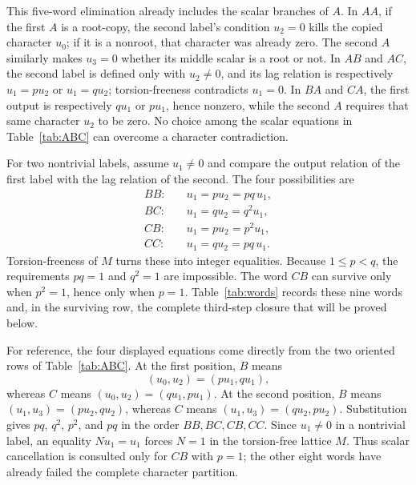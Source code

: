 \documentclass[11pt]{article}
\theoremstyle{definition}
\theoremstyle{remark}
\begin{document}
This five-word elimination already includes the scalar branches of $A$.
In $AA$, if the first $A$ is a root-copy, the second label's condition
$u_2=0$ kills the copied character $u_0$; if it is a nonroot, that character
was already zero.  The second $A$ similarly makes $u_3=0$ whether its middle
scalar is a root or not.  In $AB$ and $AC$, the second label is defined only
with $u_2\neq0$, and its lag relation is respectively
$u_1=p u_2$ or $u_1=q u_2$; torsion-freeness contradicts $u_1=0$.  In
$BA$ and $CA$, the first output is respectively $q u_1$ or $p u_1$, hence
nonzero, while the second $A$ requires that same character $u_2$ to be
zero.  No choice among the scalar equations in Table~\ref{tab:ABC} can
overcome a character contradiction.

For two nontrivial labels, assume $u_1\neq0$ and compare the output relation of the first label with the lag relation of the second.  The four possibilities are
\begin{align}
BB:&\quad u_1=p u_2=pq\,u_1, 
\label{eq:BB}\\
BC:&\quad u_1=q u_2=q^2u_1,
\label{eq:BC}\\
CB:&\quad u_1=p u_2=p^2u_1,
\label{eq:CB}\\
CC:&\quad u_1=q u_2=pq\,u_1.
\label{eq:CC}
\end{align}
Torsion-freeness of $M$ turns these into integer equalities.  Because $1\leq p<q$, the requirements $pq=1$ and $q^2=1$ are impossible.  The word $CB$ can survive only when $p^2=1$, hence only when $p=1$.  Table~\ref{tab:words} records these nine words and, in the surviving row, the complete third-step closure that will be proved below.

For reference, the four displayed equations come directly from the two
oriented rows of Table~\ref{tab:ABC}.  At the first position, $B$ means
\[
(u_0,u_2)=(p u_1,q u_1),
\]
whereas $C$ means $(u_0,u_2)=(q u_1,p u_1)$.  At the second position, $B$
means $(u_1,u_3)=(p u_2,q u_2)$, whereas $C$ means
$(u_1,u_3)=(q u_2,p u_2)$.  Substitution gives $pq$, $q^2$, $p^2$, and
$pq$ in the order $BB,BC,CB,CC$.  Since $u_1\neq0$ in a nontrivial label,
an equality $N u_1=u_1$ forces $N=1$ in the torsion-free lattice $M$.
Thus scalar cancellation is consulted only for $CB$ with $p=1$; the other
eight words have already failed the complete character partition.
\end{document}
